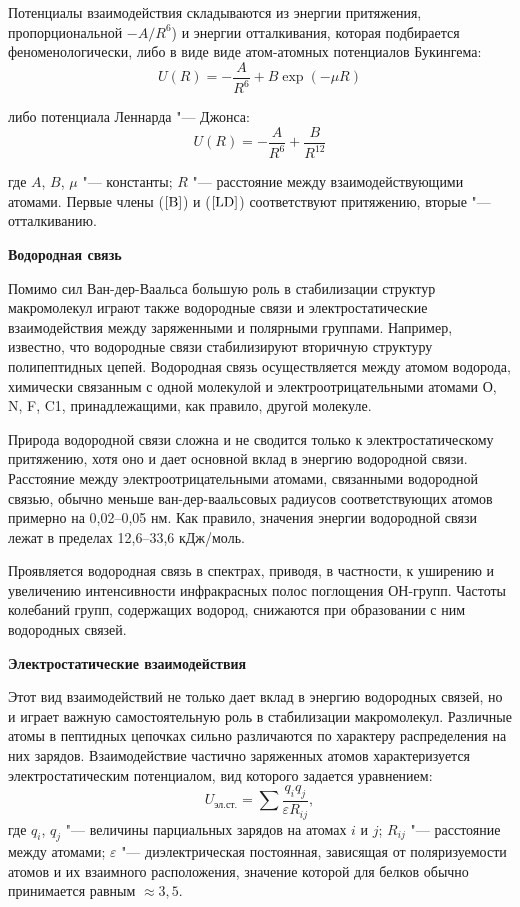 \documentclass[12pt,a4paper,oneside]{book}
\begin{document}
Потенциалы взаимодействия складываются из энергии притяжения, пропорциональной $-A/R^6 $) и энергии отталкивания, которая подбирается феноменологически, либо в виде виде атом-атомных
потенциалов Букингема: 
\begin{equation}
\label{B} 
U(R)=-\dfrac{A}{R^6} + B \exp(-\mu R)
\end{equation}

либо потенциала Леннарда "--- Джонса:
\begin{equation}
\label{LD} 
U(R)=-\dfrac{A}{R^6} + \dfrac{B}{R^{12}}
\end{equation}

где $ A $, $ B $, $\mu $ "--- константы; $R$ "--- расстояние между взаимодействующими атомами. Первые члены ($\ref{B}$) и ($\ref{LD}$) соответствуют притяжению, вторые "--- отталкиванию.

\textbf{Водородная связь}

Помимо сил Ван-дер-Ваальса большую роль в стабилизации структур макромолекул играют также водородные связи и электростатические взаимодействия между заряженными и полярными группами. Например, известно, что водородные связи стабилизируют вторичную структуру полипептидных цепей.
Водородная связь осуществляется между атомом водорода, химически связанным с одной молекулой и электроотрицательными атомами О, N, F, C1, принадлежащими, как правило, другой молекуле. 

Природа водородной связи сложна и не сводится только к электростатическому притяжению, хотя оно и дает основной вклад в энергию водородной связи. Расстояние между электроотрицательными атомами, связанными водородной связью, обычно меньше ван-дер-ваальсовых радиусов соответствующих атомов примерно на 0,02--0,05 нм. Как правило, значения энергии водородной связи лежат в пределах 12,6--33,6 кДж/моль.

Проявляется водородная связь в спектрах, приводя, в частности, к уширению и увеличению интенсивности инфракрасных полос поглощения ОН-групп. Частоты колебаний групп, содержащих водород, снижаются при образовании с ним водородных связей.

\textbf{Электростатические взаимодействия}

Этот вид взаимодействий не только дает вклад в энергию водородных связей, но и играет важную самостоятельную роль в стабилизации макромолекул. Различные атомы в пептидных цепочках сильно различаются по характеру распределения на них зарядов. Взаимодействие частично заряженных атомов характеризуется электростатическим потенциалом, вид которого задается уравнением:
\begin{equation}
	\label{el} 
	U_{\text{эл.ст.}} = \sum \dfrac{q_i q_j}{\varepsilon R_{ij}},
\end{equation}
где $ q_i $, $ q_j $ "--- величины парциальных зарядов на атомах $ i $ и $ j $; $ R_{ij} $ "--- расстояние между атомами; $ \varepsilon $ "--- диэлектрическая постоянная, зависящая от поляризуемости атомов и их взаимного расположения, значение которой для белков обычно принимается равным $\approx3{,}5$.
\end{document}
